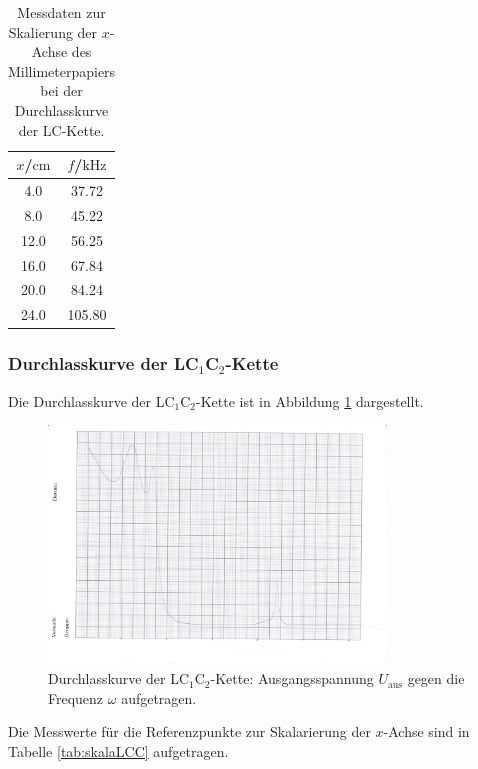 \begin{table}
	\caption{Messdaten zur Skalierung der $x$-Achse des Millimeterpapiers bei der 
	Durchlasskurve der LC-Kette.}
	\label{tab:skalaLC}
	\centering
	\begin{tabular}{cc}
	\toprule
	$x$/$\si{\centi\meter}$ & $f$/$\si{\kilo\hertz}$ \\
	\midrule
		4.0 & 37.72 \\
		8.0 & 45.22 \\
		12.0 & 56.25 \\
		16.0 & 67.84 \\
		20.0 & 84.24 \\
		24.0 & 105.80 \\
	\bottomrule
	\end{tabular}
\end{table}



\FloatBarrier
\subsubsection{Durchlasskurve der LC$_1$C$_2$-Kette}

Die Durchlasskurve der LC$_1$C$_2$-Kette ist in Abbildung \ref{fig:durchiLCC} dargestellt.

\begin{figure}
	\centering
	\includegraphics[width=0.8\textwidth]{Bilder/durchlasskurve_lc1c2.jpg}
	\caption{Durchlasskurve der LC$_1$C$_2$-Kette: Ausgangsspannung $U_{\text{aus}}$ gegen 
	die Frequenz $\omega$ aufgetragen.}
	\label{fig:durchiLCC}
\end{figure}

Die Messwerte für die Referenzpunkte zur Skalarierung der $x$-Achse sind in Tabelle 
\ref{tab:skalaLCC} aufgetragen.

